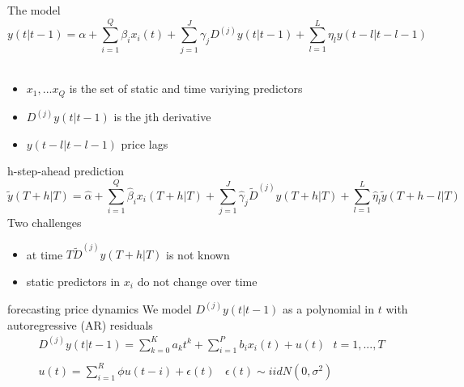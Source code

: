 \documentclass[hyperref={pdfpagelabels=false}]{beamer}
\begin{document}
\begin{frame}{The model} %
\begin{equation}
y(t|t-1)=\alpha+\sum_{i=1}^{Q}\beta_ix_i(t)+\sum_{j=1}^J\gamma_jD^{(j)}y(t|t-1)+\sum_{l=1}^L\eta_ly(t-l|t-l-1) \nonumber
\end{equation}
\newline \\
\begin{itemize}
	\item $x_1,...x_Q$ is the set of static and time variying predictors
	\item $D^{(j)}y(t|t-1)$ is the jth derivative
	\item $y(t-l|t-l-1)$ price lags
\end{itemize}
\end{frame}

\begin{frame}{h-step-ahead prediction}
\small
\begin{equation}
\tilde{y}(T+h|T)=\hat{\alpha}+\sum_{i=1}^{Q}\hat{\beta}_ix_i(T+h|T)+\sum_{j=1}^J\hat{\gamma}_j\tilde{D}^{(j)}y(T+h|T)+\sum_{l=1}^L\hat{\eta}_l\tilde{y}(T+h-l|T) \nonumber
\end{equation}
\normalsize
\newline
Two challenges
\begin{itemize}
	\item at time $T \tilde{D}^{(j)}y(T+h|T)$ is not known
	\item static predictors in $x_i$ do not change over time
\end{itemize}
\end{frame}

\begin{frame}{forecasting price dynamics} %
We model $D^{(j)}y(t|t-1)$ as a polynomial in $t$ with autoregressive (AR) residuals
\begin{align}
D^{(j)}y(t|t-1) =\sum_{k=0}^Ka_kt^k+\sum_{i=1}^Pb_ix_i(t)+u(t) \ \ \ t=1,...,T \nonumber \\ \nonumber \\ u(t)=\sum_{i=1}^R\phi u(t-i)+\epsilon(t) \ \ \ \ \epsilon(t) \sim iidN(0,\sigma^2) \nonumber
\end{align} 
\end{frame}
\end{document}
